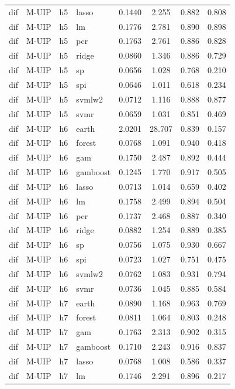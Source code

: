 \begin{ThreePartTable}
\begin{longtable}[t]{llclcccc}
dif & M-UIP & h5 & lasso & 0.1440 & 2.255 & 0.882 & 0.808\\
dif & M-UIP & h5 & lm & 0.1776 & 2.781 & 0.890 & 0.898\\
dif & M-UIP & h5 & pcr & 0.1763 & 2.761 & 0.886 & 0.828\\
dif & M-UIP & h5 & ridge & 0.0860 & 1.346 & 0.886 & 0.729\\
dif & M-UIP & h5 & sp & 0.0656 & 1.028 & 0.768 & 0.210\\
dif & M-UIP & h5 & spi & 0.0646 & 1.011 & 0.618 & 0.234\\
dif & M-UIP & h5 & svmlw2 & 0.0712 & 1.116 & 0.888 & 0.877\\
dif & M-UIP & h5 & svmr & 0.0659 & 1.031 & 0.851 & 0.469\\
\addlinespace
dif & M-UIP & h6 & earth & 2.0201 & 28.707 & 0.839 & 0.157\\
dif & M-UIP & h6 & forest & 0.0768 & 1.091 & 0.940 & 0.418\\
dif & M-UIP & h6 & gam & 0.1750 & 2.487 & 0.892 & 0.444\\
dif & M-UIP & h6 & gamboost & 0.1245 & 1.770 & 0.917 & 0.505\\
dif & M-UIP & h6 & lasso & 0.0713 & 1.014 & 0.659 & 0.402\\
dif & M-UIP & h6 & lm & 0.1758 & 2.499 & 0.894 & 0.504\\
dif & M-UIP & h6 & pcr & 0.1737 & 2.468 & 0.887 & 0.340\\
dif & M-UIP & h6 & ridge & 0.0882 & 1.254 & 0.889 & 0.385\\
dif & M-UIP & h6 & sp & 0.0756 & 1.075 & 0.930 & 0.667\\
dif & M-UIP & h6 & spi & 0.0723 & 1.027 & 0.751 & 0.475\\
dif & M-UIP & h6 & svmlw2 & 0.0762 & 1.083 & 0.931 & 0.794\\
dif & M-UIP & h6 & svmr & 0.0736 & 1.045 & 0.885 & 0.584\\
\addlinespace
dif & M-UIP & h7 & earth & 0.0890 & 1.168 & 0.963 & 0.769\\
dif & M-UIP & h7 & forest & 0.0811 & 1.064 & 0.803 & 0.248\\
dif & M-UIP & h7 & gam & 0.1763 & 2.313 & 0.902 & 0.315\\
dif & M-UIP & h7 & gamboost & 0.1710 & 2.243 & 0.916 & 0.837\\
dif & M-UIP & h7 & lasso & 0.0768 & 1.008 & 0.586 & 0.337\\
dif & M-UIP & h7 & lm & 0.1746 & 2.291 & 0.896 & 0.217\\

\end{longtable}
\end{ThreePartTable}
